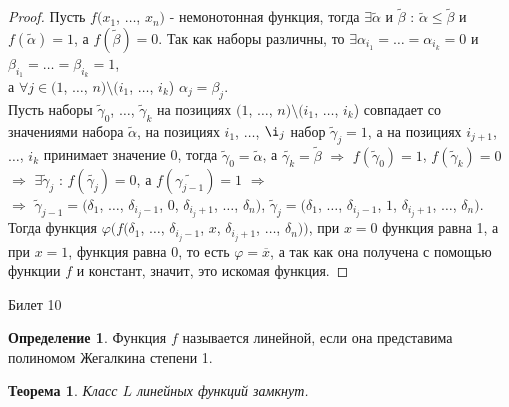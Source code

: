 \documentclass[a4paper, 12pt]{article}
\renewcommand{\phi}{\varphi}
\theoremstyle{definition}
\newtheorem*{definition}{Определение}
\theoremstyle{plain}
\newtheorem*{theorem}{Теорема}
\theoremstyle{remark}
\begin{document}
  \begin{proof}
    Пусть $f(x_1$, $\ldots$, $x_n)$ - немонотонная функция, тогда $\exists\tilde{\alpha}$ и $\tilde{\beta}$ : $\tilde{\alpha}\leqslant\tilde{\beta}$ и $f(\tilde{\alpha})=1$, а $f(\tilde{\beta})=0$. Так как наборы различны, то $\exists\alpha_{i_1}=\ldots=\alpha_{i_k}=0$ и $\beta_{i_1}=\ldots=\beta_{i_k}=1$,\\ а $\forall j\in(1$, $\ldots$, $n)\setminus(i_1$, $\ldots$, $i_k$) $\alpha_j=\beta_j$.\\ Пусть наборы $\tilde{\gamma}_0$, $\ldots$, $\tilde{\gamma}_k$ на позициях $(1$, $\ldots$, $n)\setminus(i_1$, $\ldots$, $i_k$) совпадает со значениями  набора $\tilde{\alpha}$, на позициях $i_1$, $\ldots$, $\i_j$ набор $\tilde{\gamma}_j=1$, а на позициях $i_{j+1}$, $\ldots$, $i_k$ принимает значение 0, тогда $\tilde{\gamma}_0=\tilde{\alpha}$, а $\tilde{\gamma_k}=\tilde{\beta}$ $\Longrightarrow$ $f(\tilde{\gamma}_0)=1$, $f(\tilde{\gamma}_k)=0$ $\Longrightarrow$ $\exists\tilde{\gamma}_j$ : $f(\tilde{\gamma_j})=0$, а $f(\tilde{\gamma_{j-1}})=1$ $\Longrightarrow$\\
    $\Longrightarrow$ $\tilde{\gamma}_{j-1}=(\delta_1$, $\ldots$, $\delta_{i_j-1}$, $0$, $\delta_{i_j+1}$, $\ldots$, $\delta_n)$, $\tilde{\gamma}_j=(\delta_1$, $\ldots$, $\delta_{i_j-1}$, $1$, $\delta_{i_j+1}$, $\ldots$, $\delta_n)$.\\
    Тогда функция $\phi(f(\delta_1$, $\ldots$, $\delta_{i_j-1}$, $x$, $\delta_{i_j+1}$, $\ldots$, $\delta_n))$, при $x=0$ функция равна 1, а при $x=1$, функция равна 0, то есть $\phi=\overline{x}$, а так как она получена с помощью функции $f$ и констант, значит, это искомая функция.
  \end{proof}
  \begin{center}
    Билет 10
  \end{center}
  \begin{definition}
    Функция $f$ называется линейной, если она представима полиномом Жегалкина степени 1.
  \end{definition}
  \begin{theorem}
    Класс $L$ линейных функций замкнут.
  \end{theorem}
\end{document}
